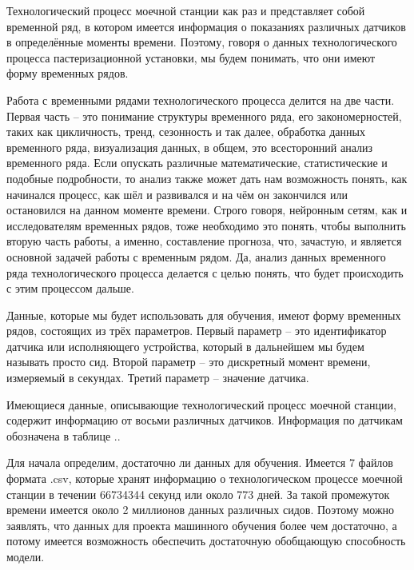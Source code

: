 {	\par \redline Технологический процесс моечной станции как раз и представляет собой временной ряд, в котором имеется информация о показаниях различных датчиков в определённые моменты времени. Поэтому, говоря о данных технологического процесса пастеризационной установки, мы будем понимать, что они имеют форму временных рядов.
	
	\par \redline Работа с временными рядами технологического процесса делится на две части. Первая часть {--} это понимание структуры временного ряда, его закономерностей, таких как цикличность, тренд, сезонность и так далее, обработка данных временного ряда, визуализация данных, в общем, это всесторонний анализ временного ряда. Если опускать различные математические, статистические и подобные подробности, то анализ также может дать нам возможность понять, как начинался процесс, как шёл и развивался и на чём он закончился или остановился на данном моменте времени.  Строго говоря, нейронным сетям, как и исследователям временных рядов, тоже необходимо это понять, чтобы выполнить вторую часть работы, а именно, составление прогноза, что, зачастую, и является основной задачей работы с временным рядом. Да, анализ данных временного ряда технологического процесса делается с целью понять, что будет происходить с этим процессом дальше.

  \par \redline Данные, которые мы будет использовать для обучения, имеют форму временных рядов, состоящих из трёх параметров. Первый параметр {--} это идентификатор датчика или исполняющего устройства, который в дальнейшем мы будем называть просто сид. Второй параметр {--} это дискретный момент времени, измеряемый в секундах. Третий параметр {--} значение датчика. 

  \par \redline Имеющиеся данные, описывающие технологический процесс моечной станции, содержит информацию от восьми различных датчиков. Информация по датчикам обозначена в таблице \thechaptercntr .\thetablecntr. 
  
  \par \redline Для начала определим, достаточно ли данных для обучения. Имеется 7 файлов формата .csv, которые хранят информацию о технологическом процессе моечной станции в течении 66734344 секунд или около 773 дней. За такой промежуток времени имеется около 2 миллионов данных различных сидов. Поэтому можно заявлять, что данных для проекта машинного обучения более чем достаточно, а потому имеется возможность обеспечить достаточную обобщающую способность модели.
  
}
